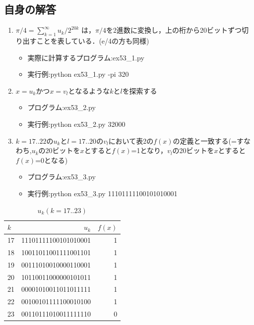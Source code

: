 \documentclass[dvipdfmx,a4paper,12pt]{jsarticle}
\begin{document}
\newpage
 \subsection*{自身の解答}
 \begin{enumerate}
 
\item  $π/4 = \sum_{k=1}^\infty u_{k}/2^{20k}$ は，$π/4$を2進数に変換し，上の桁から20ビットずつ切り出すことを表している．(e/4の方も同様)
 
\begin{itemize}
\item 実際に計算するプログラム:ex53\_1.py
\item 実行例:python ex53\_1.py -pi 320
\end{itemize}

\item $x=u_{k}$かつ$x=v_{l}$となるような$k$と$l$を探索する
\begin{itemize}
\item プログラム:ex53\_2.py
\item 実行例:python ex53\_2.py 32000
\end{itemize}

\item  $k=17..22$の$u_{k}$と$l=17..20$の$v_{l}$において表2の$f(x)$の定義と一致する(=すなわち,$u_{k}$の20ビットを$x$とすると$f(x)$=1となり，$v_{l}$の20ビットを$x$とすると$f(x)$=0となる)

\begin{itemize}
\item プログラム:ex53\_3.py
\item 実行例:python ex53\_3.py 11101111100101010001
\end{itemize}




 \end{enumerate}
 
  \begin{table}[h]
 \caption{$u_{k}(k=17..23)$}
 {\scriptsize
 \hspace{4cm}
 \begin{tabular}{l|r|r}
 $k$ & $u_{k}$ & $f(x)$  \\ \hline
 17 & 11101111100101010001 & 1 \\
 18 &10011011001111001101 & 1\\
19 &00111010010000110001 &1 \\
20 &10110011000000101011&1\\
21 &00001010011011011111&1\\
22 &00100101111100010100&1\\
23 &00110111010011111110&0\\
\end{tabular}
 }
 \end{table}
 
\end{document}
